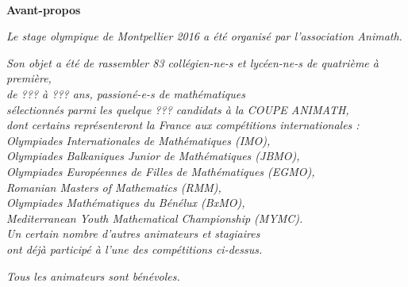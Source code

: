 \pagebreak

\pagestyle{empty}~

 \pagebreak



\clearpage


\begin{flushright}

\textbf{\Large{Avant-propos}}

\bigskip

\emph{Le stage olympique de Montpellier 2016 a été organisé par l'association Animath.}

\bigskip

\emph{Son objet a été de rassembler 83 collégien-ne-s et lycéen-ne-s de quatrième à première, \\ de ??? à ??? ans, passioné-e-s de mathématiques \\ sélectionnés parmi les quelque ??? candidats à la COUPE ANIMATH, \\ dont certains  représenteront la France aux compétitions internationales : \\
Olympiades Internationales de Mathématiques (IMO), \\ Olympiades Balkaniques Junior de Mathématiques (JBMO), \\ Olympiades Européennes de Filles de Mathématiques (EGMO), \\ Romanian Masters of Mathematics (RMM), \\ Olympiades Mathématiques du Bénélux (BxMO), \\ Mediterranean Youth Mathematical Championship (MYMC). \\ Un certain nombre d'autres animateurs et stagiaires \\ ont déjà participé à l'une des compétitions ci-dessus.}
 
\bigskip

\emph{Tous les animateurs sont bénévoles.} 
\end{flushright}




\pagebreak

\mbox { }

\pagebreak
